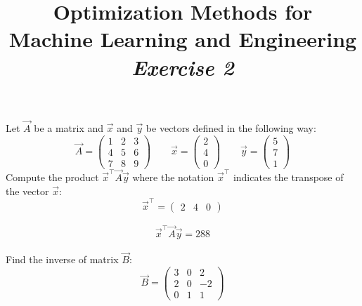 



\author{}
\date{}
\title{Optimization Methods for \\Machine Learning and Engineering\\\vspace{0.5cm}\textit{Exercise 2}}
\maketitle


\setcounter{section}{2}
\setcounter{exercise}{0}


\begin{exercise}[subtitle={Paper}]
Let $\vec A$ be a matrix and $\vec{x}$ and $\vec{y}$ be vectors defined in the following way:
\begin{equation*}
\vec A = 
\begin{pmatrix}
1 & 2 & 3\\
4 & 5 & 6\\
7 & 8 & 9
\end{pmatrix} \qquad \vec{x} = \begin{pmatrix}
2 \\4\\ 0
\end{pmatrix}
\qquad \vec{y} = \begin{pmatrix}
5 \\ 7 \\ 1
\end{pmatrix}
\end{equation*}
Compute the product $\vec{x}^\top \vec{A}\vec{y}$ where the notation $\vec{x}^\top$ indicates the transpose of the vector $\vec{x}$:
\begin{equation*}
\vec{x}^\top = \begin{pmatrix}
2 & 4 & 0
\end{pmatrix}
\end{equation*}
\end{exercise}

\begin{solution}[print=false]
\begin{align*}
\vec{x}^\top\vec{A}\vec{y} = 288
\end{align*}
\end{solution}

\begin{exercise}[subtitle={Notebook}]
  Find the inverse of matrix $\vec B$:
  \begin{equation*}
 \vec B =  \begin{pmatrix}
  3 & 0 & 2\\
  2 & 0 & -2\\
  0 & 1 & 1
    \end{pmatrix}
  \end{equation*}
\end{exercise}


